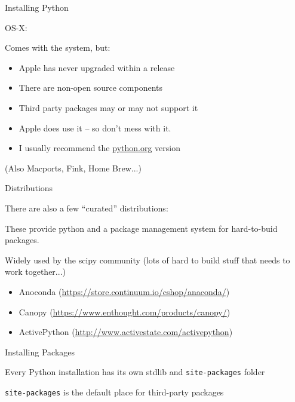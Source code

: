 \documentclass{beamer}
\begin{document}
\begin{frame}[fragile]{Installing Python}

{\Large OS-X:}

Comes with the system, but:
\begin{itemize}
    \item Apple has never upgraded within a release
    \item There are non-open source components
    \item Third party packages may or may not support it
    \item Apple does use it -- so don't mess with it.
    \item I usually recommend the \url{python.org} version
\end{itemize}
(Also Macports, Fink, Home Brew...)

\vfill
\end{frame} 

\begin{frame}[fragile]{Distributions}

\vfill
{\Large There are also a few ``curated'' distributions:}

\vfill
{\Large These provide python and a package management system for hard-to-buid packages.}

\vfill
{\Large Widely used by the scipy community (lots of hard to build stuff that needs to work together...)}

{\large
\begin{itemize}
  \item Anoconda (\url{https://store.continuum.io/cshop/anaconda/})
  \item Canopy (\url{https://www.enthought.com/products/canopy/})
  \item ActivePython (\url{http://www.activestate.com/activepython})
\end{itemize}
}

\end{frame} 

\begin{frame}[fragile]{Installing Packages}

{\Large Every Python installation has its own stdlib and \verb|site-packages| folder}

\vfill
{\Large\verb|site-packages| is the default place for third-party packages}

\end{frame} 
\end{document}
